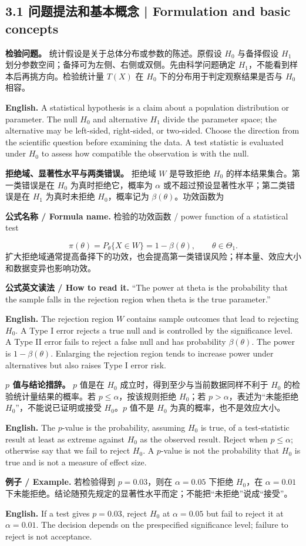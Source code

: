 \documentclass[UTF8,11pt,a4paper]{ctexart}
\newcommand{\EN}[1]{\par\noindent\textbf{English.} #1\par}
\newcommand{\READ}[1]{\par\noindent\textbf{公式英文读法 / How to read it.} #1\par}
\newcommand{\FORMULA}[2]{\par\noindent\textbf{公式名称 / Formula name.} #1 / #2\par}
\newcommand{\EX}[2]{\par\noindent\textbf{例子 / Example.} #1\par\EN{#2}}
\begin{document}
\subsection*{3.1 问题提法和基本概念 | Formulation and basic concepts}
\noindent\textbf{检验问题。} 统计假设是关于总体分布或参数的陈述。原假设 $H_0$ 与备择假设 $H_1$ 划分参数空间；备择可为左侧、右侧或双侧。先由科学问题确定 $H_1$，不能看到样本后再挑方向。检验统计量 $T(X)$ 在 $H_0$ 下的分布用于判定观察结果是否与 $H_0$ 相容。
\EN{A statistical hypothesis is a claim about a population distribution or parameter. The null $H_0$ and alternative $H_1$ divide the parameter space; the alternative may be left-sided, right-sided, or two-sided. Choose the direction from the scientific question before examining the data. A test statistic is evaluated under $H_0$ to assess how compatible the observation is with the null.}

\noindent\textbf{拒绝域、显著性水平与两类错误。} 拒绝域 $W$ 是导致拒绝 $H_0$ 的样本结果集合。第一类错误是在 $H_0$ 为真时拒绝它，概率为 $\alpha$ 或不超过预设显著性水平；第二类错误是在 $H_1$ 为真时未拒绝 $H_0$，概率记为 $\beta(\theta)$。功效函数为
\FORMULA{检验的功效函数}{power function of a statistical test}
\[
\pi(\theta)=P_\theta\{X\in W\}=1-\beta(\theta),\qquad \theta\in\Theta_1.
\]
扩大拒绝域通常提高备择下的功效，也会提高第一类错误风险；样本量、效应大小和数据变异也影响功效。
\READ{“The power at theta is the probability that the sample falls in the rejection region when theta is the true parameter.”}
\EN{The rejection region $W$ contains sample outcomes that lead to rejecting $H_0$. A Type I error rejects a true null and is controlled by the significance level. A Type II error fails to reject a false null and has probability $\beta(\theta)$. The power is $1-\beta(\theta)$. Enlarging the rejection region tends to increase power under alternatives but also raises Type I error risk.}

\noindent\textbf{$p$ 值与结论措辞。} $p$ 值是在 $H_0$ 成立时，得到至少与当前数据同样不利于 $H_0$ 的检验统计量结果的概率。若 $p\le\alpha$，按该规则拒绝 $H_0$；若 $p>\alpha$，表述为“未能拒绝 $H_0$”，不能说已证明或接受 $H_0$。$p$ 值不是 $H_0$ 为真的概率，也不是效应大小。
\EN{The $p$-value is the probability, assuming $H_0$ is true, of a test-statistic result at least as extreme against $H_0$ as the observed result. Reject when $p\le\alpha$; otherwise say that we fail to reject $H_0$. A $p$-value is not the probability that $H_0$ is true and is not a measure of effect size.}

\EX{若检验得到 $p=0.03$，则在 $\alpha=0.05$ 下拒绝 $H_0$，在 $\alpha=0.01$ 下未能拒绝。结论随预先规定的显著性水平而定；不能把“未拒绝”说成“接受”。}{If a test gives $p=0.03$, reject $H_0$ at $\alpha=0.05$ but fail to reject it at $\alpha=0.01$. The decision depends on the prespecified significance level; failure to reject is not acceptance.}
\end{document}
